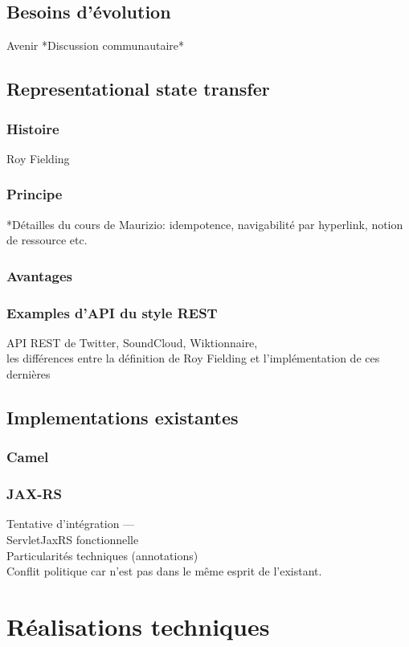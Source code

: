 \subsection{Besoins d'évolution}
Avenir
*Discussion communautaire*
\subsection{Representational state transfer}
\subsubsection{Histoire}
Roy Fielding
\subsubsection{Principe}
*Détailles du cours de Maurizio: idempotence, navigabilité par hyperlink, 
notion de ressource etc.
\subsubsection{Avantages}
\subsubsection{Examples d'API du style REST}
API REST de Twitter, SoundCloud, Wiktionnaire,\\
les différences entre la définition de Roy Fielding et l'implémentation de ces dernières

\subsection{Implementations existantes}
\subsubsection{Camel}
\subsubsection{JAX-RS}
Tentative d'intégration ---\\
ServletJaxRS fonctionnelle\\
Particularités techniques (annotations) \\
Conflit politique car n'est pas dans le même esprit de l'existant.\\



\newpage

\section{Réalisations techniques}

